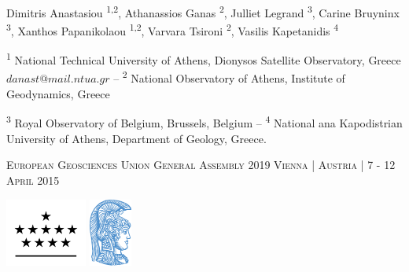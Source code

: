 \documentclass[landscape,a0paper,fontscale=0.315]{baposter} %
\begin{document}
\begin{poster}
{\large Dimitris Anastasiou \textsuperscript{1,2}, Athanassios Ganas \textsuperscript{2}, Julliet Legrand \textsuperscript{3}, Carine Bruyninx \textsuperscript{3}, Xanthos Papanikolaou \textsuperscript{1,2}, Varvara Tsironi \textsuperscript{2}, Vasilis Kapetanidis \textsuperscript{4} 
{\small \par{\textsuperscript{1} National Technical University of Athens, Dionysos Satellite Observatory, Greece \(danast@mail.ntua.gr\) -- \textsuperscript{2} National Observatory of Athens, Institute of Geodynamics, Greece} 
\par{\textsuperscript{3} Royal Observatory of Belgium, Brussels, Belgium --  \textsuperscript{4} National ana Kapodistrian University of Athens, Department of Geology, Greece. }} \vspace{0.3em}
\par{\textsc{European Geosciences Union General Assembly 2019 Vienna | Austria | 7 - 12 April 2015}} 
 }
{\includegraphics[height=6em]{../../logos/logo_orb.png} \includegraphics[height=6em]{../../logos/logo_uoa_blue.png}} %




\end{poster}
\end{document}
